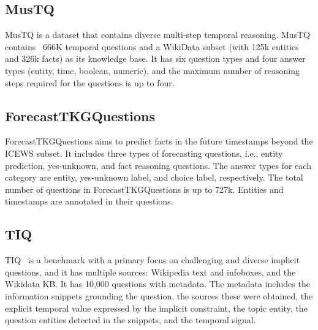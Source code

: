 \subsection{\textbf{MusTQ}}MusTQ \cite{zhangMusTQTemporalKnowledge2024} is a dataset that contains diverse multi-step temporal reasoning. MusTQ contains ~666K temporal questions and a WikiData subset (with 125k entities and 326k facts) as its knowledge base. It has six question types and four answer types (entity, time, boolean, numeric), and the maximum number of reasoning steps required for the questions is up to four.


\subsection{\textbf{ForecastTKGQuestions}}ForecastTKGQuestions \cite{dingForecastTKGQuestionsBenchmarkTemporal2022} aims to predict facts in the future timestamps beyond the ICEWS subset. It includes three types of forecasting questions, i.e., entity prediction, yes-unknown, and fact reasoning questions. The answer types for each category are entity, yes-unknown label, and choice label, respectively. The total number of questions in ForecastTKGQuestions is up to 727k. Entities and timestamps are annotated in their questions. 

\subsection{\textbf{TIQ}}TIQ~\cite{jiaFaithfulTemporalQuestion2024} is a benchmark with a primary focus on challenging and diverse implicit questions, and it has multiple sources: Wikipedia text and infoboxes, and the Wikidata KB. It has 10,000 questions with metadata. The metadata includes the information snippets grounding the question, the sources these were obtained, the explicit temporal value expressed by the implicit constraint, the topic entity, the question entities detected in the snippets, and the temporal signal.



